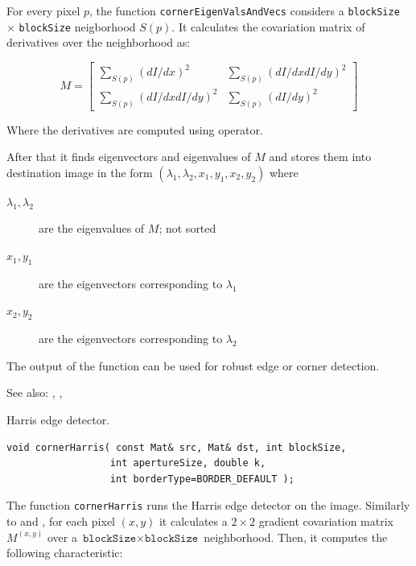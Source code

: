 For every pixel $p$, the function \texttt{cornerEigenValsAndVecs} considers a \texttt{blockSize} $\times$ \texttt{blockSize} neigborhood $S(p)$. It calculates the covariation matrix of derivatives over the neighborhood as:

\[
M = \begin{bmatrix}
\sum_{S(p)}(dI/dx)^2 & \sum_{S(p)}(dI/dx dI/dy)^2 \\
\sum_{S(p)}(dI/dx dI/dy)^2 & \sum_{S(p)}(dI/dy)^2
\end{bmatrix}
\]

Where the derivatives are computed using  operator.

After that it finds eigenvectors and eigenvalues of $M$ and stores them into destination image in the form
$(\lambda_1, \lambda_2, x_1, y_1, x_2, y_2)$ where
\begin{description}
\item[$\lambda_1, \lambda_2$]are the eigenvalues of $M$; not sorted
\item[$x_1, y_1$]are the eigenvectors corresponding to $\lambda_1$
\item[$x_2, y_2$]are the eigenvectors corresponding to $\lambda_2$
\end{description}

The output of the function can be used for robust edge or corner detection.

See also: , , 

\label{cornerHarris}
Harris edge detector.

\begin{lstlisting}
void cornerHarris( const Mat& src, Mat& dst, int blockSize,
                  int apertureSize, double k,
                  int borderType=BORDER_DEFAULT );
\end{lstlisting}
\begin{description}
\end{description}

The function \texttt{cornerHarris} runs the Harris edge detector on the image. Similarly to  and , for each pixel $(x, y)$ it calculates a $2\times2$ gradient covariation matrix $M^{(x,y)}$ over a $\texttt{blockSize} \times \texttt{blockSize}$ neighborhood. Then, it computes the following characteristic:

